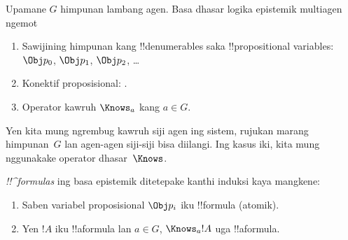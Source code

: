 \documentclass[../../../include/open-logic-section]{subfiles}
\begin{document}


\begin{defn}
Upamane $G$ himpunan lambang agen. Basa dhasar logika epistemik
multiagen ngemot
\begin{enumerate}
  \item Sawijining himpunan kang !!{denumerable}s saka !!{propositional variable}s: $\Obj
    p_0$, $\Obj p_1$, $\Obj p_2$, \dots
  \item Konektif proposisional: \startycommalist
  .
  \item Operator kawruh $\Knows_a$ kang $a \in G$.
\end{enumerate}
\end{defn}

Yen kita mung ngrembug kawruh siji agen ing sistem, rujukan marang
himpunan~$G$ lan agen-agen siji-siji bisa diilangi. Ing kasus iki,
kita mung nggunakake operator dhasar~$\Knows$.

\begin{defn}
\emph{!!^{formula}s} ing basa epistemik ditetepake kanthi induksi
  kaya mangkene:
\begin{enumerate}


\item Saben variabel proposisional $\Obj p_i$ iku !!{formula} (atomik).






\item Yen $!A$ iku !!a{formula} lan $a \in G$, $\Knows_a !A$
  uga !!a{formula}.

\end{enumerate}
\end{defn}
\end{document}

